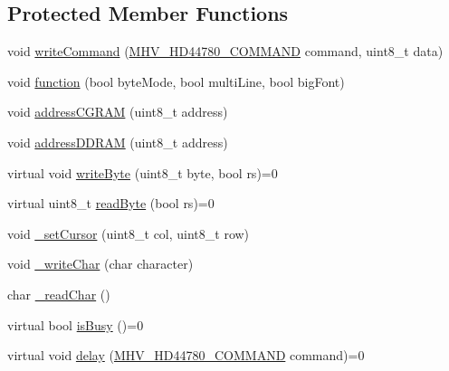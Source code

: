 \subsection*{Protected Member Functions}
\begin{DoxyCompactItemize}
\item 
void \hyperlink{class_m_h_v___display___h_d44780_a06f4d1f004e6abf227ec3d5aaa86313e}{write\-Command} (\hyperlink{_m_h_v___display___h_d44780_8h_a76bff68a0c366080486a09e3beec77e1}{M\-H\-V\-\_\-\-H\-D44780\-\_\-\-C\-O\-M\-M\-A\-N\-D} command, uint8\-\_\-t data)
\item 
void \hyperlink{class_m_h_v___display___h_d44780_a0d47dded9c8cba635ab6f0d9748dfd38}{function} (bool byte\-Mode, bool multi\-Line, bool big\-Font)
\item 
void \hyperlink{class_m_h_v___display___h_d44780_a818c44100b53a0c477f2f47bf580ca0d}{address\-C\-G\-R\-A\-M} (uint8\-\_\-t address)
\item 
void \hyperlink{class_m_h_v___display___h_d44780_a6b02df9220d37a2a6c075b86b9c80b15}{address\-D\-D\-R\-A\-M} (uint8\-\_\-t address)
\item 
virtual void \hyperlink{class_m_h_v___display___h_d44780_ab7df02f891c4c8c4be054eeb9881abc7}{write\-Byte} (uint8\-\_\-t byte, bool rs)=0
\item 
virtual uint8\-\_\-t \hyperlink{class_m_h_v___display___h_d44780_ae219bc8342ff92efe1469261dd05684a}{read\-Byte} (bool rs)=0
\item 
void \hyperlink{class_m_h_v___display___h_d44780_a59d1f489e0d036076796c96a3f84e909}{\-\_\-set\-Cursor} (uint8\-\_\-t col, uint8\-\_\-t row)
\item 
void \hyperlink{class_m_h_v___display___h_d44780_afbfe39fe3f140c40142b400e855ed994}{\-\_\-write\-Char} (char character)
\item 
char \hyperlink{class_m_h_v___display___h_d44780_a9a098d584c7e3c54a8107f7402f2e540}{\-\_\-read\-Char} ()
\item 
virtual bool \hyperlink{class_m_h_v___display___h_d44780_a2ca9b62d41637bc6a20c2b195fdfa711}{is\-Busy} ()=0
\item 
virtual void \hyperlink{class_m_h_v___display___h_d44780_a41a09bd562eefae2e8a4b23ac15bd67c}{delay} (\hyperlink{_m_h_v___display___h_d44780_8h_a76bff68a0c366080486a09e3beec77e1}{M\-H\-V\-\_\-\-H\-D44780\-\_\-\-C\-O\-M\-M\-A\-N\-D} command)=0
\end{DoxyCompactItemize}
